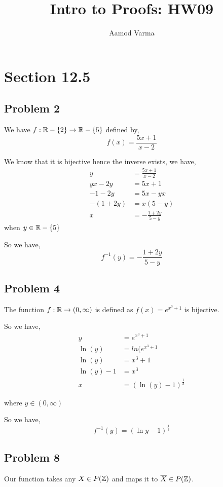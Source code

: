 \documentclass[a4paper]{report}
\title{Intro to Proofs: HW09}
\author{Aamod Varma}
\begin{document}
\maketitle
\date{}

\section*{Section 12.5}
\subsection*{Problem 2}
We have $f: \mathbb{R} - \{2\} \rightarrow \mathbb{R} - \{5\}$ defined by, 
$$ f(x) = \frac{5x + 1}{x - 2} $$ 

We know  that it is bijective hence the inverse exists, we have, 
\begin{align*}
    y &= \frac{5x + 1}{x - 2}\\
    yx - 2y &= 5x + 1\\
           -1 - 2y &= 5x - yx\\
                -(1 + 2y)&= x(5 - y)\\
                         x&= -\frac{1 + 2y}{5 - y}
\end{align*}
when $y \in \mathbb{R} - \{5\}$

So we have,  
$$ f^{-1}(y) = -\frac{1 + 2y}{5 - y} $$ 



\subsection*{Problem 4}
The function $f: \mathbb{R} \rightarrow (0, \infty)$ is defined as  $f(x) = e^{x^{3} + 1}$ is bijective. 

So we have, 
\begin{align*}
    y &= e^{x^{3} + 1}\\
    \ln(y) &= ln(e^{x^{3} + 1}\\
    \ln(y) &= x^{3} + 1\\
    \ln(y) - 1 &= x^{3}\\
    x &= (\ln(y) - 1)^{\frac{1}{3}}
\end{align*}

where $y \in (0,\infty)$

So we have,  
$$ f^{-1}(y) = (\ln y - 1)^{\frac{1}{3}} $$ 

\subsection*{Problem 8}
Our function takes any $X \in P(\mathbb{Z})$ and maps it to $\overline X \in P(\mathbb{Z})$. 
\end{document}
